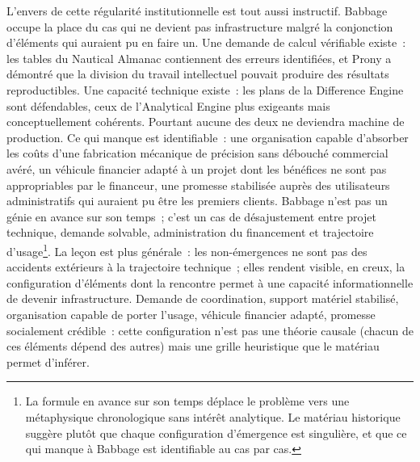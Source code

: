 L'envers de cette régularité institutionnelle est tout aussi instructif. Babbage occupe la place du cas qui ne devient pas infrastructure malgré la conjonction d'éléments qui auraient pu en faire un. Une demande de calcul vérifiable existe~: les tables du Nautical Almanac contiennent des erreurs identifiées, et Prony a démontré que la division du travail intellectuel pouvait produire des résultats reproductibles. Une capacité technique existe~: les plans de la Difference Engine sont défendables, ceux de l'Analytical Engine plus exigeants mais conceptuellement cohérents. Pourtant aucune des deux ne deviendra machine de production. Ce qui manque est identifiable~: une organisation capable d'absorber les coûts d'une fabrication mécanique de précision sans débouché commercial avéré, un véhicule financier adapté à un projet dont les bénéfices ne sont pas appropriables par le financeur, une promesse stabilisée auprès des utilisateurs administratifs qui auraient pu être les premiers clients. Babbage n'est pas un génie en avance sur son temps~; c'est un cas de désajustement entre projet technique, demande solvable, administration du financement et trajectoire d'usage\footnote{La formule \og en avance sur son temps\fg{} déplace le problème vers une métaphysique chronologique sans intérêt analytique. Le matériau historique suggère plutôt que chaque configuration d'émergence est singulière, et que ce qui manque à Babbage est identifiable au cas par cas.}. La leçon est plus générale~: les non-émergences ne sont pas des accidents extérieurs à la trajectoire technique~; elles rendent visible, en creux, la configuration d'éléments dont la rencontre permet à une capacité informationnelle de devenir infrastructure. Demande de coordination, support matériel stabilisé, organisation capable de porter l'usage, véhicule financier adapté, promesse socialement crédible~: cette configuration n'est pas une théorie causale (chacun de ces éléments dépend des autres) mais une grille heuristique que le matériau permet d'inférer.

